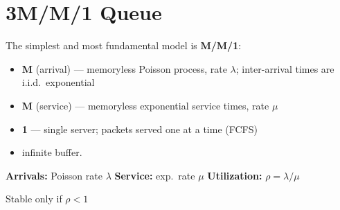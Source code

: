 \documentclass[10pt,a4paper]{article}
\begin{document}
\section*{3\quad M/M/1 Queue}
The simplest and most fundamental model is \textbf{M/M/1}:
\begin{itemize}
  \item \textbf{M} (arrival) --- memoryless Poisson process, rate $\lambda$; inter-arrival times are i.i.d.\ exponential
  \item \textbf{M} (service) --- memoryless exponential service times, rate $\mu$
  \item \textbf{1} --- single server; packets served one at a time (FCFS)
  \item infinite buffer.
\end{itemize}
\begin{keybox}
  
\textbf{Arrivals:} Poisson rate $\lambda$ \quad
\textbf{Service:} exp.\ rate $\mu$ \quad
\textbf{Utilization:} $\rho = \lambda/\mu$
\end{keybox}
\begin{warnbox}
Stable only if $\rho < 1$
\end{warnbox}

\vspace{4pt}
\end{document}
